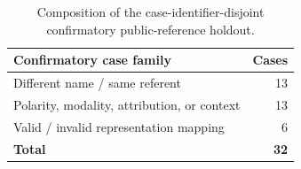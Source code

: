 \begin{table}[t]
\centering
\small
\begin{tabular}{lr}
\toprule
\textbf{Confirmatory case family} & \textbf{Cases} \\
\midrule
Different name / same referent & 13 \\
Polarity, modality, attribution, or context & 13 \\
Valid / invalid representation mapping & 6 \\
\midrule
\textbf{Total} & \textbf{32} \\
\bottomrule
\end{tabular}
\caption{Composition of the case-identifier-disjoint confirmatory public-reference holdout.}
\label{tab:confirmatory-families}
\end{table}
